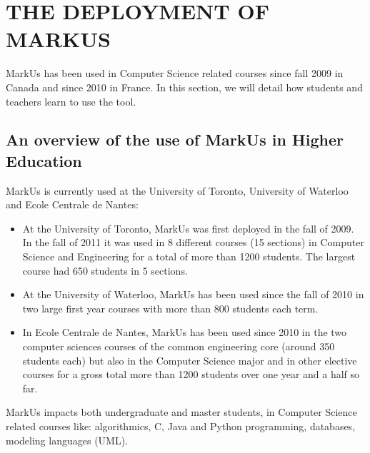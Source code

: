 \documentclass[twocolumn,10pt]{asme2e}
\begin{document}
\section*{THE DEPLOYMENT OF MARKUS}

MarkUs has been used in Computer Science related courses since fall 2009 in Canada and since 2010 in France. In this section, we will detail how students and teachers learn to use the tool.

\subsection*{An overview of the use of MarkUs in Higher Education}

MarkUs is currently used at the University of Toronto, University of Waterloo and Ecole Centrale de Nantes: 
\begin{itemize}
\item At the University of Toronto, MarkUs was first deployed in the fall of 2009. In the fall of 2011 it was used in 8 different courses (15 sections) in Computer Science and Engineering for a total of more than 1200 students. The largest course had 650 students in 5 sections. 
\item At the University of Waterloo, MarkUs has been used since the fall of 2010 in two large first year courses with more than 800 students each term.
\item In Ecole Centrale de Nantes, MarkUs has been used since 2010 in the two  computer sciences courses of the common engineering core (around 350 students each) but also in the Computer Science major and in other elective courses for a gross total more than 1200 students over one year and a half so far.
\end{itemize}

MarkUs impacts both undergraduate and master students, in Computer Science related courses like: algorithmics, C, Java and Python programming, databases, modeling languages (UML). %


\end{document}
